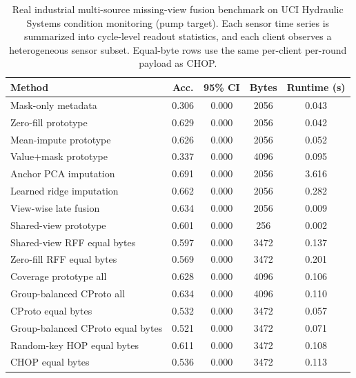 \begin{table}[t]
\centering
\caption{Real industrial multi-source missing-view fusion benchmark on UCI Hydraulic Systems condition monitoring (pump target). Each sensor time series is summarized into cycle-level readout statistics, and each client observes a heterogeneous sensor subset. Equal-byte rows use the same per-client per-round payload as CHOP.}
\label{tab:if-hydraulic-fusion}
\scriptsize
\setlength{\tabcolsep}{3pt}
\renewcommand{\arraystretch}{0.94}
\begin{tabular}{lcccc}
\toprule
Method & Acc. & 95\% CI & Bytes & Runtime (s) \\
\midrule
Mask-only metadata & 0.306 & 0.000 & 2056 & 0.043 \\
Zero-fill prototype & 0.629 & 0.000 & 2056 & 0.042 \\
Mean-impute prototype & 0.626 & 0.000 & 2056 & 0.052 \\
Value+mask prototype & 0.337 & 0.000 & 4096 & 0.095 \\
Anchor PCA imputation & 0.691 & 0.000 & 2056 & 3.616 \\
Learned ridge imputation & 0.662 & 0.000 & 2056 & 0.282 \\
View-wise late fusion & 0.634 & 0.000 & 2056 & 0.009 \\
Shared-view prototype & 0.601 & 0.000 & 256 & 0.002 \\
Shared-view RFF equal bytes & 0.597 & 0.000 & 3472 & 0.137 \\
Zero-fill RFF equal bytes & 0.569 & 0.000 & 3472 & 0.201 \\
Coverage prototype all & 0.628 & 0.000 & 4096 & 0.106 \\
Group-balanced CProto all & 0.634 & 0.000 & 4096 & 0.110 \\
CProto equal bytes & 0.532 & 0.000 & 3472 & 0.057 \\
Group-balanced CProto equal bytes & 0.521 & 0.000 & 3472 & 0.071 \\
Random-key HOP equal bytes & 0.611 & 0.000 & 3472 & 0.108 \\
CHOP equal bytes & 0.536 & 0.000 & 3472 & 0.113 \\
\bottomrule
\end{tabular}
\end{table}
